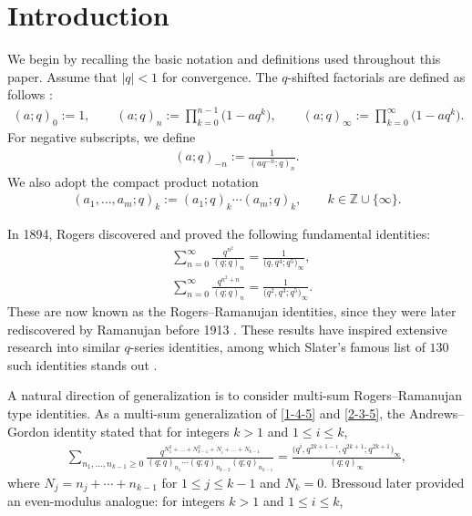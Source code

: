 \documentclass[pdftex]{sigma}
\numberwithin{equation}{section}
\theoremstyle{definition}
\begin{document}
\section{Introduction}
We begin by recalling the basic notation and definitions used throughout this paper. Assume that $|q|<1$ for convergence. The $q$-shifted factorials are defined as follows \cite{red}:
\begin{align*}
 (a;q)_0:=1,\qquad (a; q)_n := \prod_{k=0}^{n-1} \bigl(1 - a q^k\bigr),\qquad (a; q)_\infty := \prod_{k=0}^{\infty} \bigl(1 - a q^k\bigr).
\end{align*}
For negative subscripts, we define
\begin{align*}
 (a;q)_{-n}:=\frac{1}{(aq^{-n};q)_n}.
\end{align*}
We also adopt the compact product notation
\begin{align*}
 (a_1, \dots, a_m; q)_k := (a_1; q)_k \cdots (a_m; q)_k, \qquad k \in \mathbb{Z} \cup \{\infty\}.
\end{align*}\par
In 1894, Rogers \cite{Rogers-1894} discovered and proved the following fundamental identities:
\begin{align}
&\sum_{n=0}^{\infty}\frac{q^{n^2}}{(q;q)_n}=\frac{1}{\bigl(q,q^4;q^5\bigr)_{\infty}},\label{1-4-5}\\
&\sum_{n=0}^{\infty}\frac{q^{n^2+n}}{(q;q)_n}=\frac{1}{\bigl(q^2,q^3;q^5\bigr)_{\infty}}.\label{2-3-5}
\end{align}
These are now known as the Rogers--Ramanujan identities, since they were later rediscovered by Ramanujan before 1913 \cite{Hardy-1937}. These results have inspired extensive research into similar $q$-series identities, among which Slater's famous list of $130$ such identities stands out \cite{Slater-1952}. \par
A natural direction of generalization is to consider multi-sum Rogers--Ramanujan type identities. As a multi-sum generalization of \eqref{1-4-5} and \eqref{2-3-5}, the Andrews--Gordon identity \cite{Andrews-1974} stated that for integers $k>1$ and $1\leq i\leq k$,
\begin{align}\label{a-g-identity}
\sum_{n_1, \dots, n_{k-1} \geq 0} \frac{q^{N_1^2 + \dots + N_{k-1}^2 + N_i + \dots + N_{k-1}}}{(q; q)_{n_1} \cdots (q; q)_{n_{k-2}} (q; q)_{n_{k-1}}} = \frac{\bigl(q^i, q^{2k + 1 - i}, q^{2k + 1}; q^{2k + 1}\bigr)_{\infty}}{(q; q)_{\infty}},
\end{align}
where $N_j=n_j+\cdots+n_{k-1}$ for $1\leq j\leq k-1$ and $N_k=0$. Bressoud \cite{Bressoud-1980} later provided an even-modulus analogue: for integers $k>1$ and $1\leq i\leq k$,
\end{document}
